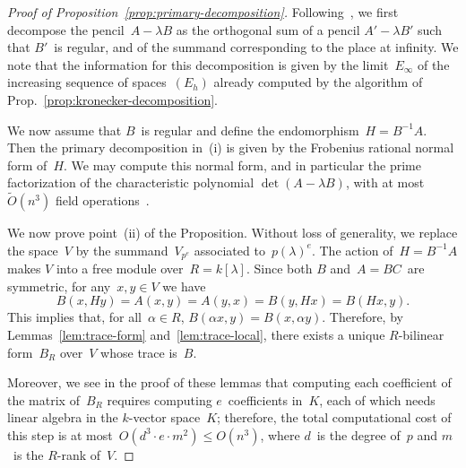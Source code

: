 \documentclass{lms}
\def\Ot{\widetilde{O}}
\begin{document}
\begin{proof}[Proof of Proposition~\ref{prop:primary-decomposition}]
Following~\cite[Lemma 4.1]{inventiones1976waterhouse},
we first decompose the pencil~$A - λ B$ as the orthogonal sum of
a pencil $A' - λ B'$ such that $B'$~is regular,
and of the summand corresponding to the place at infinity.
We note that the information for this decomposition is given
by the limit~$E_{∞}$ of the increasing sequence of spaces~$(E_{h})$
already computed by the algorithm of Prop.~\ref{prop:kronecker-decomposition}.

We now assume that $B$~is regular and define the endomorphism~$H = B^{-1} A$.
Then the primary decomposition in~(i) is given by
the Frobenius rational normal form of~$H$.
We may compute this normal form, and in particular
the prime factorization of the characteristic polynomial $\det (A - λ B)$,
with at most~$\Ot(n^3)$ field operations~\cite{kaltoffen11compute}.

\medbreak

We now prove point~(ii) of the Proposition.
Without loss of generality, we replace the space~$V$
by the summand~$V_{p^e}$ associated to~$p(λ)^e$.
The action of~$H = B^{-1} A$ makes $V$ into a free module over~$R = k[λ]$.
Since both $B$ and~$A=BC$~are symmetric, for any~$x, y ∈ V$ we have
\begin{equation}
B(x, H y) = A(x, y) = A(y, x) = B(y, H x) = B(H x, y).
\end{equation}
This implies that, for all~$α ∈ R$, $B(α x, y) = B(x, α y)$.
Therefore, by Lemmas~\ref{lem:trace-form} and~\ref{lem:trace-local},
there exists a unique $R$-bilinear form~$B_R$ over~$V$ whose trace is~$B$.

Moreover, we see in the proof of these lemmas
that computing each coefficient of the matrix of~$B_R$
requires computing $e$~coefficients in~$K$,
each of which needs linear algebra in the $k$-vector space~$K$;
therefore, the total computational cost of this step
is at most~$O(d^3 · e · m^2) ≤ O(n^3)$,
where $d$~is the degree of~$p$ and $m$~is the $R$-rank of~$V$.

\medbreak


\end{proof}
\end{document}
